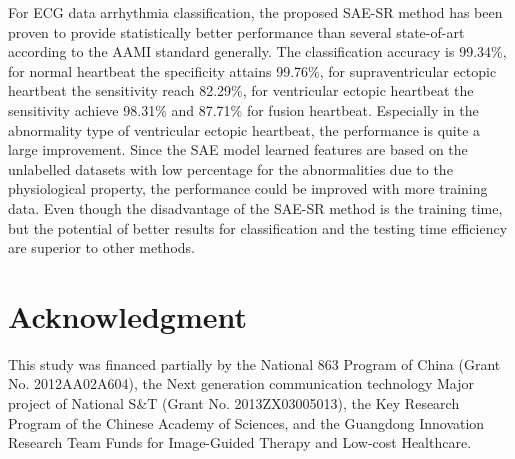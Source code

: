 \documentclass[journal]{IEEEtran}
\begin{document}
For ECG data arrhythmia classification, the proposed SAE-SR method has been proven to provide statistically better performance than several state-of-art according to the AAMI standard generally. The classification accuracy is 99.34\%, for normal heartbeat the specificity attains 99.76\%, for supraventricular ectopic heartbeat the sensitivity reach 82.29\%, for ventricular ectopic heartbeat the sensitivity achieve 98.31\% and 87.71\% for fusion heartbeat. Especially in the abnormality type of ventricular ectopic heartbeat, the performance is quite a large improvement. Since the SAE model learned features are based on the unlabelled datasets with low percentage for the abnormalities due to the physiological property, the performance could be improved with more training data. Even though the disadvantage of the SAE-SR method is the training time, but the potential of better results for classification and the testing time efficiency are superior to other methods. 


\section*{Acknowledgment}
This study was financed partially by the National 863 Program of China (Grant No. 2012AA02A604), the Next generation communication technology Major project of National S\&T (Grant No. 2013ZX03005013), the Key Research Program of the Chinese Academy of Sciences, and the Guangdong Innovation Research Team Funds for Image-Guided Therapy and Low-cost Healthcare. 
\ifCLASSOPTIONcaptionsoff
  \newpage
\fi



%
%
%
  
\end{document}
